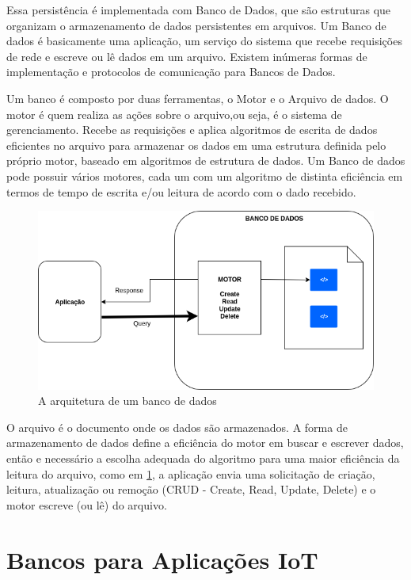 Essa persistência é implementada com Banco de Dados, que são estruturas que organizam o armazenamento de dados persistentes em arquivos. Um Banco de dados é  basicamente uma aplicação, um serviço do sistema que recebe requisições de rede e escreve ou lê dados em um arquivo. Existem inúmeras formas de implementação e protocolos de comunicação para Bancos de Dados.

Um banco é composto por duas ferramentas, o Motor e o Arquivo de dados. O motor é quem realiza as ações sobre o arquivo,ou seja, é o sistema de gerenciamento. Recebe as requisições e aplica algoritmos de escrita de dados eficientes no arquivo para armazenar os dados em uma estrutura definida pelo próprio motor, baseado em algoritmos de estrutura de dados. Um Banco de dados pode possuir vários motores, cada um com um algoritmo de distinta eficiência em termos de tempo de escrita e/ou leitura de acordo com o dado recebido.

\begin{figure}[h!]
\centering
\includegraphics[width=12cm]{./02_Capitulos/02_Cap3/figures/Database_Arch}
\caption{A arquitetura de um banco de dados}
\label{fig:3.3.5/database_arch}
\end{figure}

O arquivo é o documento onde os dados são armazenados. A forma de armazenamento de dados define a eficiência do motor em buscar e escrever dados, então e necessário a escolha adequada do algoritmo para uma maior eficiência da leitura do arquivo, como em \ref{fig:3.3.5/database_arch}, a aplicação envia uma solicitação de criação, leitura, atualização ou remoção (CRUD - Create, Read, Update, Delete) e o motor escreve (ou lê) do arquivo.


 
\section{Bancos para Aplicações IoT}
\label{section:bancos_IoT}


